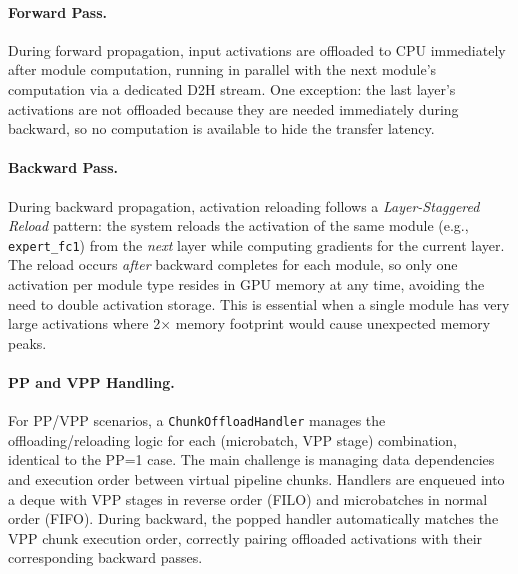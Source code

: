 \paragraph{Forward Pass.}
During forward propagation, input activations are offloaded to CPU immediately after module computation, running in parallel with the next module's computation via a dedicated D2H stream. One exception: the last layer's activations are not offloaded because they are needed immediately during backward, so no computation is available to hide the transfer latency.

\paragraph{Backward Pass.}
During backward propagation, activation reloading follows a \textit{Layer-Staggered Reload} pattern: the system reloads the activation of the same module (e.g., \texttt{expert\_fc1}) from the \textit{next} layer while computing gradients for the current layer. The reload occurs \textit{after} backward completes for each module, so only one activation per module type resides in GPU memory at any time, avoiding the need to double activation storage. This is essential when a single module has very large activations where 2$\times$ memory footprint would cause unexpected memory peaks.

\paragraph{PP and VPP Handling.}
For PP/VPP scenarios, a \texttt{Chunk\-Offload\-Handler} manages the offloading/reloading logic for each (microbatch, VPP stage) combination, identical to the PP=1 case. The main challenge is managing data dependencies and execution order between virtual pipeline chunks. Handlers are enqueued into a deque with VPP stages in reverse order (FILO) and microbatches in normal order (FIFO). During backward, the popped handler automatically matches the VPP chunk execution order, correctly pairing offloaded activations with their corresponding backward passes.


